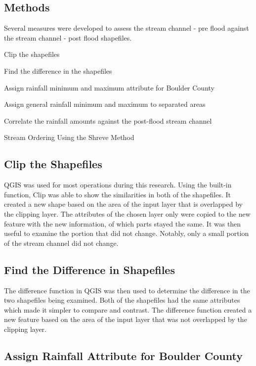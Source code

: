 \documentclass[twoside]{article}
\begin{document}
\begin{multicols}{2}
\section{Methods}

Several measures were developed to assess the stream channel - pre flood against the stream channel - post flood shapefiles.
\begin{compactitem}
\item Clip the shapefiles
\item Find the difference in the shapefiles
\item Assign rainfall minimum and maximum attribute for Boulder County
\item Assign general rainfall minimum and maximum to separated areas
\item Correlate the rainfall amounts against the post-flood stream channel
\item Stream Ordering Using the Shreve Method

\end{compactitem}

\subsection{Clip the Shapefiles}
QGIS was used for most operations during this research. Using the built-in function, Clip was able to show the similarities in both of the shapefiles. It created a new shape based on the area of the input layer that is overlapped by the clipping layer. The attributes of the chosen layer only were copied to the new feature with the new information, of which parts stayed the same. It was then useful to examine the portion that did not change. Notably, only a small portion of the stream channel did not change.


\subsection{Find the Difference in Shapefiles}
The difference function in QGIS was then used to determine the difference in the two shapefiles being examined. Both of the shapefiles had the same attributes which made it simpler to compare and contrast. The difference function created a new feature based on the area of the input layer that was not overlapped by the clipping layer.


\subsection{Assign Rainfall Attribute for Boulder County}


\end{multicols}
\end{document}
